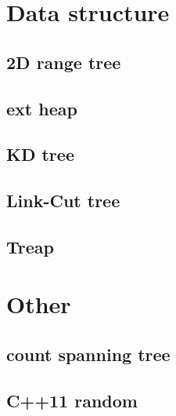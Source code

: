 \section{Data structure}
	\subsection{2D range tree}
		
	\subsection{ext heap}
		
	\subsection{KD tree}
		
	\subsection{Link-Cut tree}
		
%		
	\subsection{Treap}
		
%		

\section{Other}
	\subsection{count spanning tree}
		
	\subsection{C++11 random}
		
%		
